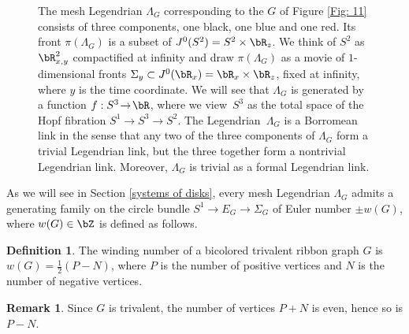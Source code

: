 \documentclass[JEP,XML,SOM,Unicode,NoFloatCountersInSection]{cedram}
\theoremstyle{plain}
\theoremstyle{definition}
\newtheorem{definition}[theorem]{Definition}
\newtheorem{remark}[theorem]{Remark}
\begin{document}
\begin{figure}[htbp]
\begin{center}
\caption{\smaller The mesh Legendrian $\Lambda_G$ corresponding to the $G$ of Figure \ref{Fig: 11} consists of three components, one black, one blue and one red. Its front $\pi(\Lambda_G)$ is a subset of $J^0(S^2)=S^2 \times \bR_z$. We think of $S^2$ as $\bR^2_{x,y}$ compactified at infinity and draw $\pi(\Lambda_G)$ as a movie of $1$-dimensional fronts $\Sigma_y \subset J^0(\bR_x)=\bR_x \times \bR_z$, fixed at infinity, where $y$ is the time coordinate. We will see that $\Lambda_G$ is generated by a function $f:S^3\!\to\!\bR$, where we view~$S^3$ as the total space of the Hopf fibration $S^1\!\to\!S^3\!\to\!S^2$. The Legendrian~$\Lambda_G$ is a Borromean link in the sense that any two of the three components of $\Lambda_G$ form a trivial Legendrian link, but the three together form a nontrivial Legendrian link. Moreover, $\Lambda_G$ is trivial as a formal Legendrian link.}
\label{Fig: start}
\end{center}
\end{figure}
%

As we will see in Section \ref{systems of disks}, every mesh Legendrian $\Lambda_G$ admits a generating family on the circle bundle $S^1 \to E_G \to \Sigma_G $ of Euler number $\pm w(G)$, where $w(G) \in \bZ$ is defined as follows.

\begin{definition}
The winding number of a bicolored trivalent ribbon graph $G$ is $w(G) = \frac{1}{2}(P-N)$, where $P$ is the number of positive vertices and $N$ is the number of negative vertices.
\end{definition}

\begin{remark}
Since $G$ is trivalent, the number of vertices $P+N$ is even, hence so is $P - N$.
\end{remark}
\end{document}
